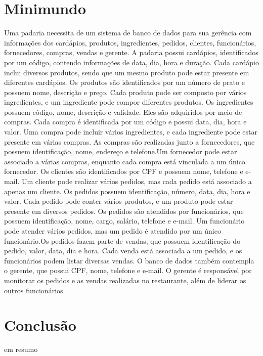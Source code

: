 \documentclass{article}
\begin{document}
\section{Minimundo}
Uma padaria necessita de um sistema de banco de dados para sua gerência com informações dos cardápios, produtos, ingredientes, pedidos, clientes, funcionários, fornecedores, compras, vendas e gerente. A padaria possui cardápios, identificados por um código, contendo informações de data, dia, hora e duração. Cada cardápio inclui diversos produtos, sendo que um mesmo produto pode estar presente em diferentes cardápios. Os produtos são identificados por um número de prato e possuem nome, descrição e preço. Cada produto pode ser composto por vários ingredientes, e um ingrediente pode compor diferentes produtos. Os ingredientes possuem código, nome, descrição e validade. Eles são adquiridos por meio de compras. Cada compra é identificada por um código e possui data, dia, hora e valor. Uma compra pode incluir vários ingredientes, e cada ingrediente pode estar presente em várias compras. As compras são realizadas junto a fornecedores, que possuem identificação, nome, endereço e telefone.Um fornecedor pode estar associado a várias compras, enquanto cada compra está vinculada a um único fornecedor. Os clientes são identificados por CPF e possuem nome, telefone e e-mail. Um cliente pode realizar vários pedidos, mas cada pedido está associado a apenas um cliente. Os pedidos possuem identificação, número, data, dia, hora e valor. Cada pedido pode conter vários produtos, e um produto pode estar presente em diversos pedidos. Os pedidos são atendidos por funcionários, que possuem identificação, nome, cargo, salário, telefone e e-mail. Um funcionário pode atender vários pedidos, mas um pedido é atendido por um único funcionário.Os pedidos fazem parte de vendas, que possuem identificação do pedido, valor, data, dia e hora. Cada venda está associada a um pedido, e os funcionários podem listar diversas vendas. O banco de dados também contempla o gerente, que possui CPF, nome, telefone e e-mail. O gerente é responsável por monitorar os pedidos e as vendas realizadas no restaurante, além de liderar os outros funcionários.

\section{Conclusão}
em resumo
\newpage
\end{document}
